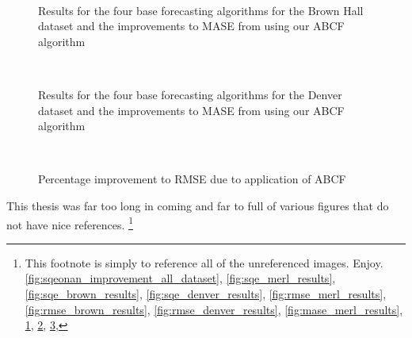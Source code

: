 \begin{figure}[!b]
	\begin{center}
		 \\
	\end{center}
	\caption{Results for the four base forecasting algorithms for the Brown Hall dataset and the improvements to MASE from using our ABCF algorithm}
	\label{fig:mase_brown_results}
\end{figure}

\begin{figure}[!t]
	\begin{center}
		 \\
	\end{center}
	\caption{Results for the four base forecasting algorithms for the Denver dataset and the improvements to MASE from using our ABCF algorithm}
	\label{fig:mase_denver_results}
\end{figure}


\begin{figure}[!b]
	\begin{center}
		 \\
	\end{center}
	\caption{Percentage improvement to RMSE due to application of ABCF}
	\label{fig:rmse_improvement_dataset}
\end{figure}


\label{app:references}
This thesis was far too long in coming and far to full of various figures that do not have nice references.  
	\footnote{This footnote is simply to reference all of the unreferenced images.  Enjoy.
		\ref{fig:sqeonan_improvement_all_dataset},
		\ref{fig:sqe_merl_results},
		\ref{fig:sqe_brown_results},
		\ref{fig:sqe_denver_results},
		\ref{fig:rmse_merl_results},
		\ref{fig:rmse_brown_results},
		\ref{fig:rmse_denver_results},
		\ref{fig:mase_merl_results},
		\ref{fig:mase_brown_results},
		\ref{fig:mase_denver_results},
		\ref{fig:rmse_improvement_dataset},
	}